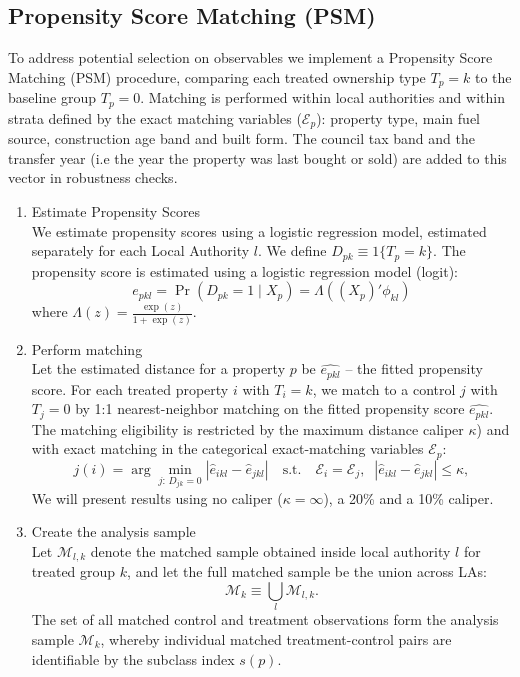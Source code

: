 \documentclass[12pt]{article}
\begin{document}
\subsection{Propensity Score Matching (PSM) }
To address potential selection on observables we implement a Propensity Score Matching (PSM) procedure, comparing each treated ownership type $T_p=k$ to the baseline group $T_p=0$. Matching is performed within local authorities and within strata defined by the exact matching variables ($\mathcal{E}_p$): property type, main fuel source, construction age band and built form. The council tax band and the transfer year (i.e the year the property was last bought or sold) are added to this vector in robustness checks. 

\begin{enumerate}
    \item Estimate Propensity Scores \\
    We estimate propensity scores using a logistic regression model, estimated separately for each Local Authority $l$. We define $D_{pk} \equiv 1\{T_p = k\}$. The propensity score is estimated using a logistic regression model (logit):
\begin{equation} \label{eq:propensity-score}
e_{pkl}
=
\Pr\!\left(D_{pk}=1 \mid X_{p}\right) = \Lambda((X_{p})'\phi_{kl})
\end{equation}
where $\Lambda(z)=\frac{\exp{(z)}}{1+\exp{(z)}}$.

\item Perform matching \\
Let the estimated distance for a property $p$ be $\widehat{e_{pkl}}$ -- the fitted propensity score. For each treated property $i$ with $T_i=k$, we match to a control $j$ with $T_j=0$ by 1:1 nearest-neighbor matching on the fitted propensity score $\widehat{e_{pkl}}$. The matching eligibility is restricted by the maximum distance caliper  $\kappa$) and with exact matching in the categorical exact-matching variables $\mathcal{E}_p$:
\begin{equation}
j(i)
=
\arg\min_{j:\,D_{jk}=0}
\left|\widehat e_{ikl}-\widehat e_{jkl}\right|
\quad\text{s.t.}\quad
\mathcal{E}_i=\mathcal{E}_j,
\;\;
\left|\widehat e_{ikl}-\widehat e_{jkl}\right|\le \kappa,
\end{equation}
We will present results using no caliper ($\kappa = \infty$), a 20\% and a 10\% caliper. 



 \item Create the analysis sample \\
 Let $\mathcal{M}_{l,k}$ denote the matched sample obtained inside local authority $l$ for treated group $k$, and let the full matched sample be the union across LAs:
    \begin{equation*}
    \mathcal{M}_{k} \equiv \bigcup_{l}\mathcal{M}_{l,k}.
    \label{eq:psm_matched_sample_union}
    \end{equation*}
The set of all matched control and treatment observations form the analysis sample $\mathcal{M}_k$, whereby individual matched treatment-control pairs are identifiable by the subclass index $s(p)$. 




\end{enumerate}
\end{document}
